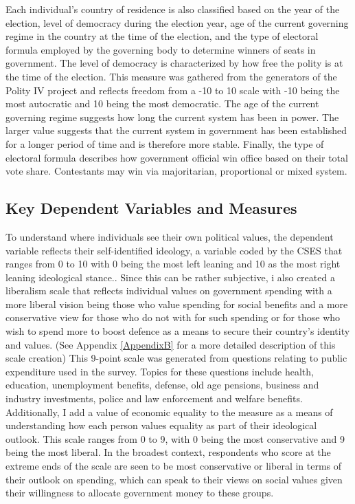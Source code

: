 \documentclass[12pt, titlepage]{article}
\begin{document}
Each individual's country of residence is also classified based on the year of the election, level of democracy during the election year,  age of the current governing regime in the country at the time of the election, and the type of electoral formula employed by the governing body to determine winners of seats in government. The level of democracy is characterized by how free the polity is at the time of the election. This measure was gathered from the generators of the Polity IV project and reflects freedom from a -10 to 10 scale with -10 being the most autocratic and 10 being the most democratic. The age of the current governing regime suggests how long the current system has been in power. The larger value suggests that the current system in government has been established for a longer period of time and is therefore more stable. Finally, the type of electoral formula describes how government official win office based on their total vote share. Contestants may win via majoritarian, proportional or mixed system. 

\subsection{Key Dependent Variables and Measures}

To understand where individuals see their own political values, the dependent variable reflects their self-identified ideology, a variable coded by the CSES that ranges from 0 to 10 with 0 being the most left leaning and 10 as the most right leaning ideological stance.. Since this can be rather subjective, i also created a liberalism scale that reflects individual values on government spending with a more liberal vision being those who value spending for social benefits and a more conservative view for those who do not with for such spending or for those who wish to spend more to boost defence as a means to secure their country's identity and values. (See Appendix \ref{AppendixB} for a more detailed description of this scale creation) This 9-point scale was generated from questions relating to public expenditure used in the survey. Topics for these questions include health, education, unemployment benefits, defense, old age pensions, business and industry investments, police and law enforcement and welfare benefits. Additionally, I add a value of economic equality to the measure as a means of understanding how each person values equality as part of their ideological outlook. This scale ranges from 0 to 9, with 0 being the most conservative and 9 being the most liberal. In the broadest context, respondents who score at the extreme ends of the scale are seen to be most conservative or liberal in terms of their outlook on spending, which can speak to their views on social values given their willingness to allocate government money to these groups.
\end{document}
